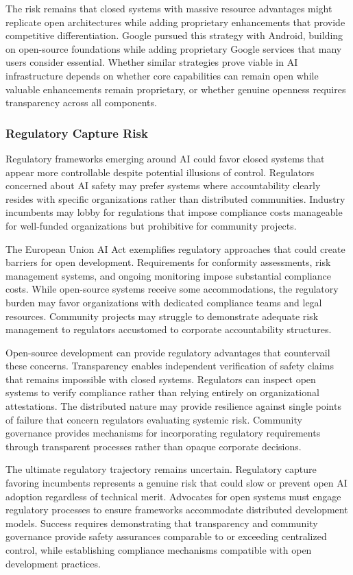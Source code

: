 The risk remains that closed systems with massive resource advantages might replicate open architectures while adding proprietary enhancements that provide competitive differentiation. Google pursued this strategy with Android, building on open-source foundations while adding proprietary Google services that many users consider essential. Whether similar strategies prove viable in AI infrastructure depends on whether core capabilities can remain open while valuable enhancements remain proprietary, or whether genuine openness requires transparency across all components.

\subsubsection{Regulatory Capture Risk}

Regulatory frameworks emerging around AI could favor closed systems that appear more controllable despite potential illusions of control. Regulators concerned about AI safety may prefer systems where accountability clearly resides with specific organizations rather than distributed communities. Industry incumbents may lobby for regulations that impose compliance costs manageable for well-funded organizations but prohibitive for community projects.

The European Union AI Act exemplifies regulatory approaches that could create barriers for open development. Requirements for conformity assessments, risk management systems, and ongoing monitoring impose substantial compliance costs. While open-source systems receive some accommodations, the regulatory burden may favor organizations with dedicated compliance teams and legal resources. Community projects may struggle to demonstrate adequate risk management to regulators accustomed to corporate accountability structures.

Open-source development can provide regulatory advantages that countervail these concerns. Transparency enables independent verification of safety claims that remains impossible with closed systems. Regulators can inspect open systems to verify compliance rather than relying entirely on organizational attestations. The distributed nature may provide resilience against single points of failure that concern regulators evaluating systemic risk. Community governance provides mechanisms for incorporating regulatory requirements through transparent processes rather than opaque corporate decisions.

The ultimate regulatory trajectory remains uncertain. Regulatory capture favoring incumbents represents a genuine risk that could slow or prevent open AI adoption regardless of technical merit. Advocates for open systems must engage regulatory processes to ensure frameworks accommodate distributed development models. Success requires demonstrating that transparency and community governance provide safety assurances comparable to or exceeding centralized control, while establishing compliance mechanisms compatible with open development practices.

